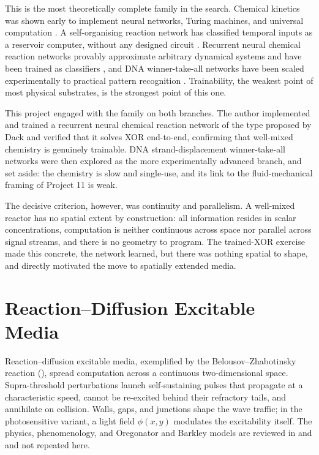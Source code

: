 This is the most theoretically complete family in the search. Chemical kinetics was shown early to implement neural networks, Turing machines, and universal computation \cite{hjelmfelt1991chemical, magnasco1997chemical}. A self-organising reaction network has classified temporal inputs as a reservoir computer, without any designed circuit \cite{baltussen2024chemical}. Recurrent neural chemical reaction networks provably approximate arbitrary dynamical systems and have been trained as classifiers \cite{dack2024rncrn}, and DNA winner-take-all networks have been scaled experimentally to practical pattern recognition \cite{cherry2018scaling}. Trainability, the weakest point of most physical substrates, is the strongest point of this one.

This project engaged with the family on both branches. The author implemented and trained a recurrent neural chemical reaction network of the type proposed by Dack \etal \cite{dack2024rncrn} and verified that it solves XOR end-to-end, confirming that well-mixed chemistry is genuinely trainable. DNA strand-displacement winner-take-all networks were then explored as the more experimentally advanced branch, and set aside: the chemistry is slow and single-use, and its link to the fluid-mechanical framing of Project 11 is weak.

The decisive criterion, however, was continuity and parallelism. A well-mixed reactor has no spatial extent by construction: all information resides in scalar concentrations, computation is neither continuous across space nor parallel across signal streams, and there is no geometry to program. The trained-XOR exercise made this concrete, the network learned, but there was nothing spatial to shape, and directly motivated the move to spatially extended media.

\section{Reaction--Diffusion Excitable Media}
\label{sec:sub_rd}

Reaction--diffusion excitable media, exemplified by the Belousov--Zhabotinsky reaction (), spread computation across a continuous two-dimensional space. Supra-threshold perturbations launch self-sustaining pulses that propagate at a characteristic speed, cannot be re-excited behind their refractory tails, and annihilate on collision. Walls, gaps, and junctions shape the wave traffic; in the photosensitive variant, a light field $\phi(x,y)$ modulates the excitability itself. The physics, phenomenology, and Oregonator and Barkley models are reviewed in  and  and not repeated here.

